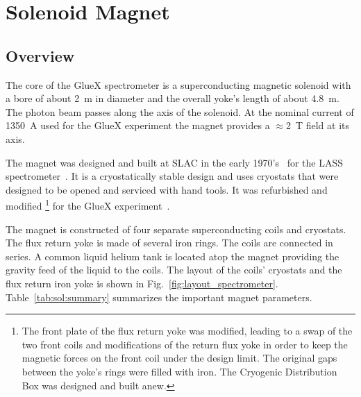 
\section[Solenoid Magnet]{Solenoid Magnet 
  \label{sec:solenoid}
}

\subsection[Overview]{Overview
 \label{sec:sol:overview}
}

The core of the GlueX spectrometer is a superconducting magnetic
solenoid with a bore of about 2~m in diameter and the overall
yoke's length of about 4.8~m. The photon beam passes along the axis of
the solenoid.  At the nominal current of 1350~A used for the GlueX
experiment the magnet provides a $\approx$2~T field at its axis.

The magnet was designed and built at SLAC in the early
1970's~\cite{Alcorn-confer-1972} for the LASS
spectrometer~\cite{Aston:1987uc}. It is a cryostatically
stable design and uses cryostats that were designed to be opened and
serviced with hand tools. It was refurbished and modified%
\footnote{
  The front plate of the flux return yoke was modified, leading to a
  swap of the two front coils and modifications of the return flux
  yoke in order to keep the magnetic forces on the front coil under
  the design limit.  The original gaps between the yoke's rings were
  filled with iron. The Cryogenic Distribution Box was designed and
  built anew.
} 
for the GlueX experiment~\cite{Ballard:2011tm, Ballard:2015wma}. 

The magnet is constructed of four separate superconducting coils and
cryostats. The flux return yoke is made of several iron rings.  The
coils are connected in series. A common liquid helium tank is located
atop the magnet providing the gravity feed of the liquid to the
coils. The layout of the coils' cryostats and the flux return iron
yoke is shown in Fig.~\ref{fig:layout_spectrometer}.
Table~\ref{tab:sol:summary} summarizes the important magnet
parameters.

  

